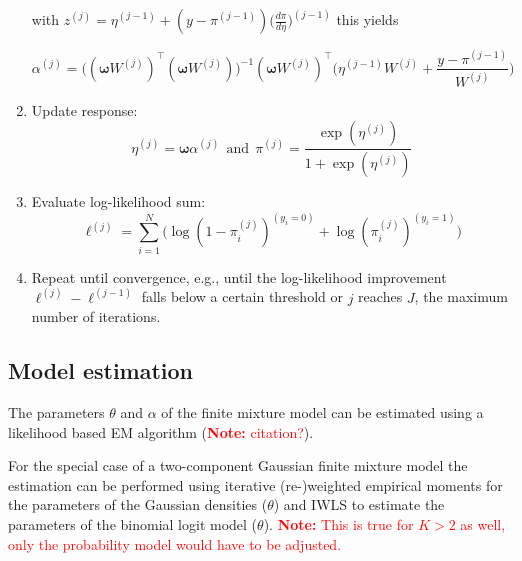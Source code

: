 \documentclass[article,nojss,shortnames]{jss}
\newcommand{\note}[1]{\textcolor{red}{\textbf{Note:} #1}}
\begin{document}
\begin{algorithm}
\begin{enumerate}
            with $\mathit{z}^{(j)} = \mathit{\eta}^{(j-1)} + (\mathit{y} - \mathit{\pi}^{(j-1)}) \Big(\frac{d\pi}{d\eta}\Big)^{(j-1)}$ this yields

            \begin{equation*}
                \mathit{\alpha}^{(j)} =
                    \big((\mathbf{\omega} \mathit{W}^{(j)})^\top
                    (\mathbf{\omega} \mathit{W}^{(j)})\big)^{-1}
                    (\mathbf{\omega} \mathit{W}^{(j)})^\top
                    \Big(\mathit{\eta}^{(j-1)} \mathit{W}^{(j)} + \frac{\mathit{y} - \mathit{\pi}^{(j-1)}}{W^{(j)}}\Big)
            \end{equation*}

        \item Update response:
            \begin{equation*}
                \mathit{\eta}^{(j)} = \mathbf{\omega}\mathit{\alpha}^{(j)}
                ~~\text{and}~~
                \mathit{\pi}^{(j)} = \frac{\exp(\mathit{\eta}^{(j)})}{1 + \exp(\mathit{\eta}^{(j)})}
            \end{equation*}

        \item Evaluate log-likelihood sum:
            \begin{equation*}
                \ell^{(j)} = %
                \sum_{i=1}^{N} \Big(\log(1 - \pi_i^{(j)})^{(y_i = 0)} + \log(\pi_i^{(j)})^{(y_i=1)}\Big)
            \end{equation*}

        \item Repeat until convergence, e.g., until the log-likelihood improvement
            $\ell^{(j)} - \ell^{(j-1)}$ falls below a certain threshold or $j$ reaches
            $J$, the maximum number of iterations.

    \end{enumerate}
\end{algorithm}



\subsection{Model estimation}

The parameters $\mathit{\theta}$ and $\mathit{\alpha}$ of the finite mixture model
can be estimated using a likelihood based EM algorithm (\note{citation?}).

For the special case of a two-component Gaussian finite mixture model the estimation
can be performed using iterative (re-)weighted empirical moments for the parameters
of the Gaussian densities ($\mathit{\theta}$) and IWLS to estimate the parameters
of the binomial logit model ($\mathit{\theta}$).
\note{This is true for $K>2$ as well, only the probability model would have to be adjusted.}
\end{document}
